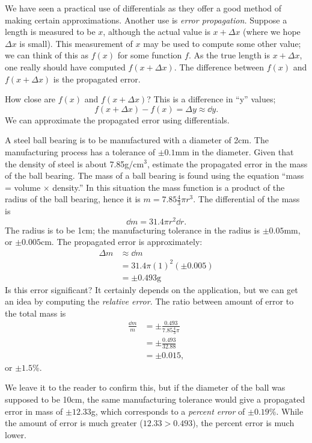 We have seen a practical use of differentials as they offer a good method of making certain approximations. Another use is \emph{error propagation.} Suppose a length is measured to be $x$, although the actual value is $x+\Delta x$ (where we hope $\Delta x$ is small). This measurement of $x$ may be used to compute some other value; we can think of this as $f(x)$ for some function $f$. As the true length is $x+\Delta x$, one really should have computed $f(x+\Delta x)$. The difference between $f(x)$ and $f(x+\Delta x)$ is the propagated error. 

How close are $f(x)$ and $f(x+\Delta x)$? This is a difference in ``y'' values;
\[f(x+\Delta x)-f(x) = \Delta y \approx \dd y.\]
We can approximate the propagated error using differentials.

\begin{example}\label{ex_diffal4}
A steel ball bearing is to be manufactured with a diameter of 2cm. The manufacturing process has a tolerance of $\pm 0.1$mm in the diameter. Given that the density of steel is about 7.85g/cm$^3$, estimate the propagated error in the mass of the ball bearing.
\solution
The mass of a ball bearing is found using the equation ``mass = volume $\times$ density.'' In this situation the mass function is a product of the radius of the ball bearing, hence it is $m = 7.85\frac43\pi r^3$. The differential of the mass is
\[\dd m = 31.4\pi r^2 \dd r.\]
The radius is to be 1cm; the manufacturing tolerance in the radius is $\pm 0.05$mm, or $\pm 0.005$cm. The propagated error is approximately:
\begin{align*}
\Delta m & \approx \dd m \\
				&= 31.4\pi (1)^2 (\pm 0.005) \\
				&= \pm 0.493\text{g}
\end{align*}
Is this error significant? It certainly depends on the application, but we can get an idea by computing the \emph{relative error}. The ratio between amount of error to the total mass is
\begin{align*}
\frac{\dd m}{m} &= \pm \frac{0.493}{7.85\frac43\pi} \\
							&=\pm \frac{0.493}{32.88}\\
							&=\pm 0.015,
\end{align*}
or $\pm 1.5$\%. 

We leave it to the reader to confirm this, but if the diameter of the ball was supposed to be 10cm, the same manufacturing tolerance would give a propagated error in mass of $\pm12.33$g, which corresponds to a \emph{percent error} of $\pm0.19$\%. While the amount of error is much greater ($12.33 > 0.493$), the percent error is much lower.
\end{example}


